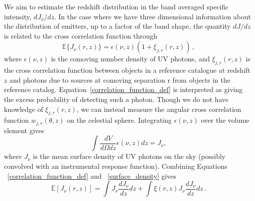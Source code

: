 \documentclass[fleqn,usenatbib]{mnras}
\begin{document}
We aim to estimate the redshift distribution in the band averaged specific intensity, $dJ_{\nu}/dz$.  In the case where we have three dimensional information about the distribution of emitters, up to a factor of the band shape, the quantity $dJ/dz$ is related to the cross correlation \cite{Newman_2008} function through
\begin{equation}
\label{correlation_function_def}
\mathbb{E}\{J_\nu (r, z)\} = \epsilon(\nu, z) (1 + \xi_{j,r}(r, z))\,,
\end{equation}
where $\epsilon(\nu, z)$ is the comoving number density of UV photons, and $\xi_{j,r}(r, z)$ is the cross correlation function between objects in a reference catalogue at redshift $z$ and photons due to sources at comoving separation r from objects in the reference catalog. Equation~\ref{correlation_function_def} is interpreted as giving the excess probability of detecting such a photon. Though we do not have knowledge of $\xi_{j, r}(r,z)$, we can instead measure the angular cross correlation function $w_{j,r}(\theta, z)$ on the celestial sphere. Integrating $\epsilon(\nu,z)$ over the volume element gives
\begin{equation}
\label{surface_density}
\int \frac{dV}{d\Omega dz} \epsilon(\nu,z) dz = J_{\nu},
\end{equation} 
where $J_{\nu}$ is the mean surface density of UV photons on the sky (possibly convolved with an instrumental response function). Combining Equations ~\ref{correlation_function_def} and ~\ref{surface_density} gives
\begin{equation}
\label{angular_correlation_step_1}
\mathbb{E}[J_\nu (r, z)] =  \int J_\nu \frac{dJ_{\nu}}{dz} dz + \int \xi(r,z) J_\nu \frac{dJ_{\nu}}{dz} dz\,.
\end{equation} 

\end{document}
